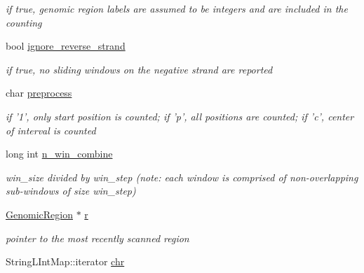 \begin{DoxyCompactItemize}
\begin{DoxyCompactList}\small\item\em if true, genomic region labels are assumed to be integers and are included in the counting \end{DoxyCompactList}\item 
\hypertarget{classGenomicRegionSetScanner_a10c1d22ae74e6f295cd17259f70eff8a}{
bool \hyperlink{classGenomicRegionSetScanner_a10c1d22ae74e6f295cd17259f70eff8a}{ignore\_\-reverse\_\-strand}}
\label{classGenomicRegionSetScanner_a10c1d22ae74e6f295cd17259f70eff8a}

\begin{DoxyCompactList}\small\item\em if true, no sliding windows on the negative strand are reported \end{DoxyCompactList}\item 
\hypertarget{classGenomicRegionSetScanner_af2a536e23023f96c57f51e2276b4be0e}{
char \hyperlink{classGenomicRegionSetScanner_af2a536e23023f96c57f51e2276b4be0e}{preprocess}}
\label{classGenomicRegionSetScanner_af2a536e23023f96c57f51e2276b4be0e}

\begin{DoxyCompactList}\small\item\em if '1', only start position is counted; if 'p', all positions are counted; if 'c', center of interval is counted \end{DoxyCompactList}\item 
\hypertarget{classGenomicRegionSetScanner_abab8a5c92ec438168e22eb6e33098aba}{
long int \hyperlink{classGenomicRegionSetScanner_abab8a5c92ec438168e22eb6e33098aba}{n\_\-win\_\-combine}}
\label{classGenomicRegionSetScanner_abab8a5c92ec438168e22eb6e33098aba}

\begin{DoxyCompactList}\small\item\em win\_\-size divided by win\_\-step (note: each window is comprised of non-\/overlapping sub-\/windows of size win\_\-step) \end{DoxyCompactList}\item 
\hypertarget{classGenomicRegionSetScanner_a60dff3d69ed195c0492711ee295720c2}{
\hyperlink{classGenomicRegion}{GenomicRegion} $\ast$ \hyperlink{classGenomicRegionSetScanner_a60dff3d69ed195c0492711ee295720c2}{r}}
\label{classGenomicRegionSetScanner_a60dff3d69ed195c0492711ee295720c2}

\begin{DoxyCompactList}\small\item\em pointer to the most recently scanned region \end{DoxyCompactList}\item 
\hypertarget{classGenomicRegionSetScanner_a3f0ba2ab42e8029297f63ba5cf2f9b95}{
StringLIntMap::iterator \hyperlink{classGenomicRegionSetScanner_a3f0ba2ab42e8029297f63ba5cf2f9b95}{chr}}
\label{classGenomicRegionSetScanner_a3f0ba2ab42e8029297f63ba5cf2f9b95}


\end{DoxyCompactItemize}
